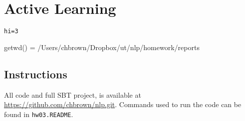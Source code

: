 \documentclass[10pt]{article}\usepackage{graphicx, color}
\makeatletter
\newenvironment{kframe}{%
 \def\at@end@of@kframe{}%
 \ifinner\ifhmode%
  \def\at@end@of@kframe{\end{minipage}}%
  \begin{minipage}{\columnwidth}%
 \fi\fi%
 \def\FrameCommand##1{\hskip\@totalleftmargin \hskip-\fboxsep
 \colorbox{shadecolor}{##1}\hskip-\fboxsep
     \hskip-\linewidth \hskip-\@totalleftmargin \hskip\columnwidth}%
 \MakeFramed {\advance\hsize-\width
   \@totalleftmargin\z@ \linewidth\hsize
   \@setminipage}}%
 {\par\unskip\endMakeFramed%
 \at@end@of@kframe}
\newenvironment{knitrout}{}{} %
\makeatother
\begin{document}
\section{Active Learning}

\begin{knitrout}\small
{}\color{fgcolor}\begin{kframe}
\begin{alltt}
hi = 3
\end{alltt}
\end{kframe}
\end{knitrout}


getwd() = /Users/chbrown/Dropbox/ut/nlp/homework/reports

\subsection{Instructions}

All code and full SBT project, is available at \url{https://github.com/chbrown/nlp.git}. Commands used to run the code can be found in \texttt{hw03.README}.
\end{document}
